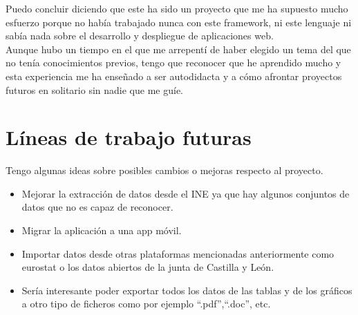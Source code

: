 Puedo concluir diciendo que este ha sido un proyecto que me ha supuesto mucho esfuerzo porque no había trabajado nunca con este framework, ni este lenguaje ni sabía nada sobre el desarrollo y despliegue de aplicaciones web.\\
Aunque hubo un tiempo en el que me arrepentí de haber elegido un tema del que no tenía conocimientos previos, tengo que reconocer que he aprendido mucho y esta experiencia me ha enseñado a ser autodidacta y a cómo afrontar proyectos futuros en solitario sin nadie que me guíe.
\section{Líneas de trabajo futuras}
Tengo algunas ideas sobre posibles cambios o mejoras respecto al proyecto.
\begin{itemize}
    \item Mejorar la extracción de datos desde el INE ya que hay algunos conjuntos de datos que no es capaz de reconocer.
    \item Migrar la aplicación a una app móvil.
    \item Importar datos desde otras plataformas mencionadas anteriormente como eurostat o los datos abiertos de la junta de Castilla y León.
    \item Sería interesante poder exportar todos los datos de las tablas y de los gráficos a otro tipo de ficheros como por ejemplo “.pdf”,“.doc”, etc.
\end{itemize}